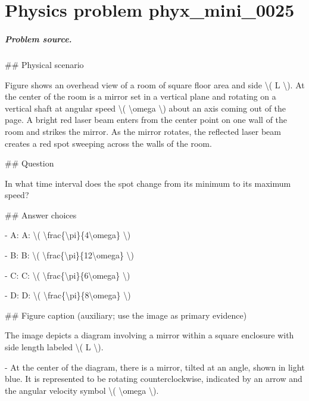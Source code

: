 
\chapter{Physics problem phyx\_mini\_0025}
\label{ch:PhyXMiniProblems_problem_phyx_mini_0025}

\paragraph{Problem source.}
\#\# Physical scenario

Figure shows an overhead view of a room of square floor area and side \textbackslash{}( L \textbackslash{}). At the center of the room is a mirror set in a vertical plane and rotating on a vertical shaft at angular speed \textbackslash{}( \textbackslash{}omega \textbackslash{}) about an axis coming out of the page. A bright red laser beam enters from the center point on one wall of the room and strikes the mirror. As the mirror rotates, the reflected laser beam creates a red spot sweeping across the walls of the room.

\#\# Question

In what time interval does the spot change from its minimum to its maximum speed?

\#\# Answer choices

- A: A: \textbackslash{}( \textbackslash{}frac\{\textbackslash{}pi\}\{4\textbackslash{}omega\} \textbackslash{})

- B: B: \textbackslash{}( \textbackslash{}frac\{\textbackslash{}pi\}\{12\textbackslash{}omega\} \textbackslash{})

- C: C: \textbackslash{}( \textbackslash{}frac\{\textbackslash{}pi\}\{6\textbackslash{}omega\} \textbackslash{})

- D: D: \textbackslash{}( \textbackslash{}frac\{\textbackslash{}pi\}\{8\textbackslash{}omega\} \textbackslash{})

\#\# Figure caption (auxiliary; use the image as primary evidence)

The image depicts a diagram involving a mirror within a square enclosure with side length labeled \textbackslash{}( L \textbackslash{}).

- At the center of the diagram, there is a mirror, tilted at an angle, shown in light blue. It is represented to be rotating counterclockwise, indicated by an arrow and the angular velocity symbol \textbackslash{}( \textbackslash{}omega \textbackslash{}).

